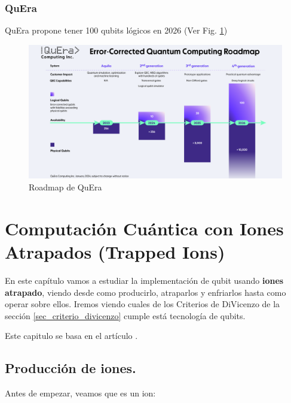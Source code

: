 \subsection{QuEra}

QuEra propone tener 100 qubits lógicos en 2026 (Ver Fig. \ref{Fig_Hardware_quera_roadmap})

	\begin{figure}[H]
	\centering 
	\includegraphics[width=1\linewidth]{Figuras/Fig_Hardware_quera_roadmap.png}
	\caption{Roadmap de QuEra}
	\label{Fig_Hardware_quera_roadmap}
	\end{figure}











\chapter{Computación Cuántica con Iones Atrapados (Trapped Ions)} \label{sec_chapter_hw_iones}


En este capítulo vamos a estudiar la implementación de qubit usando \textbf{iones atrapado}, viendo desde como producirlo, atraparlos y enfriarlos hasta como operar sobre ellos. Iremos viendo cuales de los Criterios de DiVicenzo de la sección \ref{sec_criterio_divicenzo} cumple está tecnología de qubits.

Este capitulo se basa en el artículo \cite{bib_ions_main}.


\section{Producción de iones.}

Antes de empezar, veamos que es un ion:

